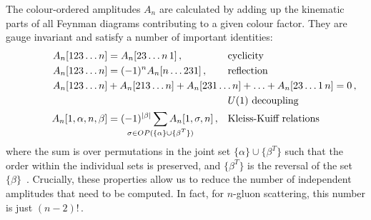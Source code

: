 \documentclass[main.tex]{subfiles}
\begin{document}
The colour-ordered amplitudes $A_n$ are calculated by adding up the kinematic parts of all Feynman diagrams contributing to a given colour factor. They are gauge invariant and satisfy a number of important identities:
\begin{align}
    A_n[123\ldots n] &= A_n[23\ldots n\,1]\,, && \text{cyclicity} \\
    A_n[123\ldots n] &= (-1)^n A_n[n \ldots 231] \,, && \text{reflection} \\
    A_n[123 \ldots n] &+ \mathrlap{A_n[213 \ldots n] +  A_n[231 \ldots n] +  \ldots + A_n[23 \ldots 1\,n] = 0 \,,} && \nonumber \\ 
    & && U(1) \text{ decoupling} \\
    A_n[1, {\alpha}, n, {\beta}] &= (-1)^{|\beta|} \sum_{\mathclap{\sigma \in OP(\{\alpha\} \cup \{\beta^T\})}} A_n[1, \sigma, n] \,, && \text{Kleiss-Kuiff relations}
\end{align}
where the sum is over permutations in the joint set $\{\alpha\} \cup \{\beta^T\}$ such that the order within the individual sets is preserved, and $\{\beta^T\}$ is the reversal of the set $\{\beta\}$~\cite{Mangano:1990by, Kleiss:1989616, Bern:2008qj}. Crucially, these properties allow us to reduce the number of independent amplitudes that need to be computed. In fact, for $n$-gluon scattering, this number is just $(n-2)!$\,.
\end{document}
